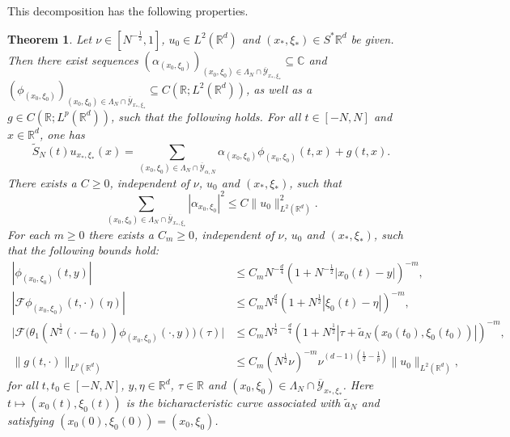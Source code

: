 \documentclass{amsart}
\numberwithin{equation}{section}
\newtheorem{theorem}{Theorem}[section]
\theoremstyle{definition}
\newcommand{\R}{\mathbb{R}}
\newcommand{\Rd}{\mathbb{R}^{d}}
\newcommand{\C}{\mathbb{C}}
\newcommand{\F}{\mathcal{F}}
\newcommand {\Sp}{S^{*}\Rd}
\begin{document}
This decomposition has the following properties.

\begin{theorem}
\label{thm:WavePacketDecomposition}
Let 
$\nu \in [N^{-\frac{1}{2}},1]$, $u_0 \in L^2(\R^d)$ and $(x_*,\xi_{*}) \in \Sp$ be given.  
Then there exist sequences $(\alpha_{(x_{0},\xi_{0})})_{(x_{0},\xi_{0})\in \Lambda_N \cap \overline{\mathcal{Y}}_{x_*,\xi_{*}}}\subseteq \C$ and \\ $(\phi_{(x_{0},\xi_{0})})_{(x_{0},\xi_{0})\in\Lambda_N \cap \overline{\mathcal{Y}}_{x_*,\xi_{*}}}\subseteq C(\R;L^{2}(\Rd))$, as well as a $g\in C(\R;L^{p}(\Rd))$, such that the following holds. For all $t\in[-N,N]$ and $x\in\Rd$, one has%
\begin{equation*}
\tilde{S}_{N}(t)u_{x_*,\xi_*}(x) = \sum_{(x_0,\xi_0) \in \Lambda_N \cap \overline{\mathcal{Y}}_{\alpha,N}} \alpha_{(x_0,\xi_0)} \phi_{(x_0,\xi_0)}(t,x) + g(t,x).
\end{equation*}
There exists a $C\geq0$, independent of %
$\nu$, $u_{0}$ and $(x_{*},\xi_{*})$, such that  
\[
\sum_{(x_0,\xi_0) \in \Lambda_N \cap \overline{\mathcal{Y}}_{x_*,\xi_{*}}} |\alpha_{x_0,\xi_0}|^2 \leq C \| u_0 \|_{L^2(\Rd)}^2.
\]
For each $m\geq0$ there exists a $C_{m}\geq0$, independent of %
$\nu$, $u_{0}$ and $(x_{*},\xi_{*})$, such that  the following bounds hold:
\begin{align*}
    |\phi_{(x_0,\xi_0)}(t,y)| &\leq\!C_{m} N^{-\frac{d}{4}} (1+N^{-\frac{1}{2}} |x_0(t) - y|)^{-m},\\
    |\F\phi_{(x_0,\xi_0)}(t,\cdot)(\eta)| &\leq\!C_{m} N^{\frac{d}{4}} (1+N^{\frac{1}{2}} |\xi_0(t) - \eta|)^{-m},\\
\big|\mathcal{F}\big(\theta_1(N^{\frac{1}{2}}(\cdot-t_0)) \phi_{(x_0,\xi_0)}(\cdot,y)\big)(\tau)\big| &\leq\!C_{m} N^{\frac{1}{2}-\frac{d}{4}} (1+N^{\frac{1}{2}}|\tau  + \tilde{a}_N(x_{0}(t_0),\xi_{0}(t_0))|)^{-m},\\
\| g(t,\cdot) \|_{L^p(\Rd)} &\leq\!C_m %
(N^{\frac{1}{2}} \nu)^{-m} \nu^{(d-1)(\frac{1}{2}-\frac{1}{p})} \| u_0 \|_{L^2(\Rd)},%
\end{align*}
for all $t,t_{0}\in[-N,N]$, $y,\eta\in\Rd$, $\tau\in\R$ and $(x_{0},\xi_{0})\in \Lambda_N \cap \overline{\mathcal{Y}}_{x_*,\xi_{*}}$. Here $t\mapsto (x_{0}(t),\xi_{0}(t))$ is the bicharacteristic curve associated with $\tilde{a}_{N}$ and satisfying $(x_{0}(0),\xi_{0}(0))=(x_{0},\xi_{0})$. 
\end{theorem}
\end{document}
